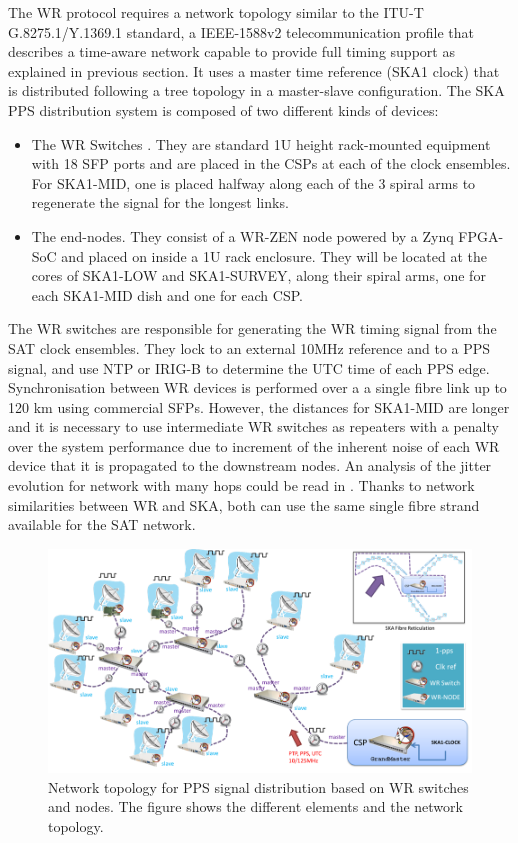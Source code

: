 The WR protocol requires a network topology similar to the ITU-T G.8275.1/Y.1369.1 standard, a IEEE-1588v2 telecommunication profile that describes a time-aware network capable to provide full timing support \cite{itu:TG8275_1_Y_1369_1} as explained in previous section. It uses a master time reference (SKA1 clock) that is distributed following a tree topology in a master-slave configuration. The SKA PPS distribution system is composed of two different kinds of devices: 

\begin{itemize}
	\item {The WR Switches \cite{sevensols:wr_switch}. They are standard 1U height rack-mounted equipment with 18 SFP ports and are placed in the CSPs at each of the clock ensembles. For SKA1-MID, one is placed halfway along each of the 3 spiral arms to regenerate the signal for the longest links.}
	\item{The end-nodes. They consist of a WR-ZEN node \cite{sevensols:wr_zen} powered by a Zynq FPGA-SoC and placed on inside a 1U rack enclosure. They will be located at the cores of SKA1-LOW and SKA1-SURVEY, along their spiral arms, one for each SKA1-MID dish and one for each CSP.}
\end{itemize}

The WR switches are responsible for generating the WR timing signal from the SAT clock ensembles. They lock to an external 10MHz reference and to a PPS signal, and use NTP or IRIG-B to determine the UTC time of each PPS edge. Synchronisation between WR devices is performed over a a single fibre link up to 120 km using commercial SFPs.
However, the distances for SKA1-MID are longer and it is necessary to use 
intermediate WR switches as repeaters with a penalty over the system 
performance due to increment of the inherent noise of each WR device that it is 
propagated to the downstream nodes. An analysis of the jitter evolution for 
network with many hops could be read in \cite{torres2016scalability}. Thanks to 
network similarities between WR and SKA, both can use the same single fibre
strand available for the SAT network. 

\begin{figure}[H]
	\centering
	\includegraphics[scale=0.4]{img/ska_pps_network}
	\caption{Network topology for PPS signal distribution based on WR switches and nodes. The figure shows the different elements and the network topology. }
	\label{fig:ska_pps_dist_network}
\end{figure}

